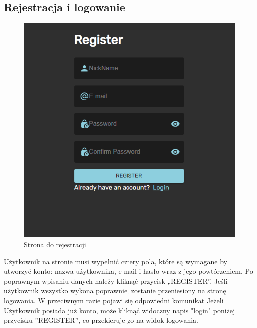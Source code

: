 \documentclass[a4paper,twoside,12pt]{book}
\begin{document}
\subsection{Rejestracja i logowanie}
\begin{figure}[H]
    \centering
    \includegraphics[width=1\textwidth]{webowka_ss/register.png}
    \caption{Strona do rejestracji}
\end{figure}
Użytkownik na stronie musi wypełnić cztery pola, które są wymagane by utworzyć konto: nazwa użytkownika, e-mail i hasło wraz z jego powtórzeniem. Po poprawnym wpisaniu danych należy kliknąć przycisk „REGISTER”. Jeśli użytkownik wszystko wykona poprawnie, zostanie przeniesiony na stronę logowania. W przeciwnym razie pojawi się odpowiedni komunikat
Jeżeli Użytkownik posiada już konto, może kliknąć widoczny napis "login" poniżej przycisku ”REGISTER”, co przekieruje go na widok logowania.
\end{document}
